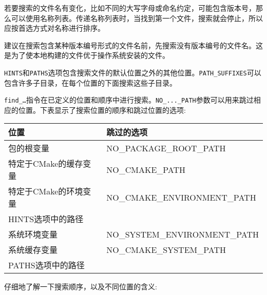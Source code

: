 若要搜索的文件名有变化，比如不同的大写字母或命名约定，可能包含版本号，那么可以使用名称列表。传递名称列表时，当找到第一个文件，搜索就会停止，所以应按首选方式对名称进行排序。

\begin{tcolorbox}[colback=blue!5!white,colframe=blue!75!black,title=搜索包含版本号的文件]
建议在搜索包含某种版本编号形式的文件名前，先搜索没有版本编号的文件名。这是为了使本地构建的文件优于操作系统安装的文件。
\end{tcolorbox}

\texttt{HINTS}和\texttt{PATHS}选项包含搜索文件的默认位置之外的其他位置。\texttt{PATH\_SUFFIXES}可以包含许多子目录，在每个位置的下面搜索这些子目录。

\texttt{find\_…}指令在已定义的位置和顺序中进行搜索。\texttt{NO\_...\_PATH}参数可以用来跳过相应的位置。下表显示了搜索位置的顺序和跳过位置的选项:

\begin{table}[H]
	\centering
	\begin{tabular}{|l|l|}
		\hline
		\textbf{位置}                     & \textbf{跳过的选项} \\ \hline
		包的根变量                & NO\_PACKAGE\_ROOT\_PATH                 \\ \hline
		特定于CMake的缓存变量        & NO\_CMAKE\_PATH                         \\ \hline
		特定于CMake的环境变量  & NO\_CMAKE\_ENVIRONMENT\_PATH            \\ \hline
		HINTS选项中的路径           &                                         \\ \hline
		系统环境变量 & NO\_SYSTEM\_ENVIRONMENT\_PATH           \\ \hline
		系统缓存变量       & NO\_CMAKE\_SYSTEM\_PATH                 \\ \hline
		PATHS选项中的路径           &                                         \\ \hline
	\end{tabular}
\end{table}

仔细地了解一下搜索顺序，以及不同位置的含义:

